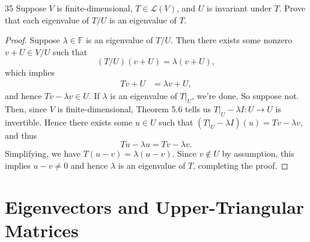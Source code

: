 \documentclass{extarticle}
\newenvironment{problem}[1]{\begin{prob*}{#1}{}}{\end{prob*}}
\newcommand{\F}{\mathbb{F}}
\newcommand{\Hom}{\mathcal{L}}
\newcommand{\restr}[1]{|_{#1}}
\begin{document}
\begin{problem}{35}
Suppose $V$ is finite-dimensional, $T\in\Hom(V)$, and $U$ is invariant under $T$.  Prove that each eigenvalue of $T/U$ is an eigenvalue of $T$.
\end{problem}
\begin{proof}
Suppose $\lambda\in\F$ is an eigenvalue of $T/U$.  Then there exists some nonzero $v + U\in V/U$ such that 
\begin{equation*}
(T/U)(v + U) = \lambda(v + U),
\end{equation*} 
which implies
\begin{align*}
Tv + U &= \lambda v + U,
\end{align*}
and hence $Tv - \lambda v \in U$.  If $\lambda$ is an eigenvalue of $T\restr{U}$, we're done.  So suppose not.  Then, since $V$ is finite-dimensional, Theorem 5.6 tells us $T\restr{U}-\lambda I: U\to U$ is invertible.  Hence there exists some $u\in U$ such that $(T\restr{U}-\lambda I)(u) = Tv - \lambda v$, and thus
\begin{equation*}
Tu - \lambda u = Tv - \lambda v.
\end{equation*}
Simplifying, we have $T(u - v) = \lambda(u - v)$.  Since $v\not\in U$ by assumption, this implies $u - v\neq 0$ and hence $\lambda$ is an eigenvalue of $T$, completing the proof. 
\end{proof}


\section{Eigenvectors and Upper-Triangular Matrices}
\end{document}

